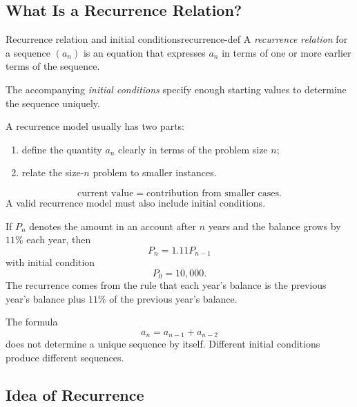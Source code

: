 \subsection{What Is a Recurrence Relation?}

\begin{definition}{Recurrence relation and initial conditions}{recurrence-def}
A \emph{recurrence relation} for a sequence $(a_n)$ is an equation that expresses $a_n$ in terms of one or more earlier terms of the sequence.

The accompanying \emph{initial conditions} specify enough starting values to determine the sequence uniquely.
\end{definition}

A recurrence model usually has two parts:
\begin{enumerate}[leftmargin=*]
    \item define the quantity $a_n$ clearly in terms of the problem size $n$;
    \item relate the size-$n$ problem to smaller instances.
\end{enumerate}

\begin{keyformula}[title={Core modelling pattern}]
\[
\text{current value} = \text{contribution from smaller cases}.
\]
A valid recurrence model must also include initial conditions.
\end{keyformula}

\begin{examplebox}[title={A simple financial example}]
If $P_n$ denotes the amount in an account after $n$ years and the balance grows by $11\%$ each year, then
\[
P_n=1.11P_{n-1}
\]
with initial condition
\[
P_0=10{,}000.
\]
The recurrence comes from the rule that each year's balance is the previous year's balance plus $11\%$ of the previous year's balance.
\end{examplebox}

\begin{commonmistake}[title={A recurrence without initial conditions is incomplete}]
The formula
\[
a_n=a_{n-1}+a_{n-2}
\]
does not determine a unique sequence by itself. Different initial conditions produce different sequences.
\end{commonmistake}

\subsection{Idea of Recurrence}

